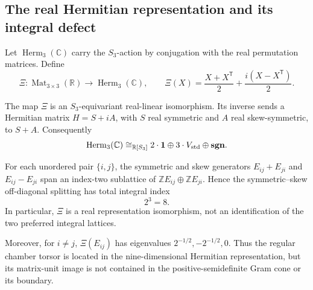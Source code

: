 \subsection{The real Hermitian representation and its integral defect}

Let \(\operatorname{Herm}_3(\mathbb C)\) carry the \(S_3\)-action by
conjugation with the real permutation matrices.  Define
\begin{equation}
 \Xi:\operatorname{Mat}_{3\times3}(\mathbb R)
       \longrightarrow\operatorname{Herm}_3(\mathbb C),
 \qquad
 \Xi(X)=\frac{X+X^{\mathsf T}}2
       +\frac{i(X-X^{\mathsf T})}2.
 \label{rnmt:eq:Xi}
\end{equation}

\begin{proposition}
\label{rnmt:prop:representation-bridge}
The map \(\Xi\) is an \(S_3\)-equivariant real-linear isomorphism.  Its
inverse sends a Hermitian matrix \(H=S+iA\), with \(S\) real symmetric and
\(A\) real skew-symmetric, to \(S+A\).  Consequently
\begin{equation}
 \operatorname{Herm}_3(\mathbb C)
 \cong_{\mathbb R[S_3]}
 2\mathbin{\cdot}\mathbf 1\oplus
 3\mathbin{\cdot}V_{\rm std}\oplus\mathbf{sgn}.
 \label{rnmt:eq:hermitian-character}
\end{equation}

For each unordered pair \(\{i,j\}\), the symmetric and skew generators
\(E_{ij}+E_{ji}\) and \(E_{ij}-E_{ji}\) span an index-two sublattice of
\(\mathbb ZE_{ij}\oplus\mathbb ZE_{ji}\).  Hence the symmetric--skew
off-diagonal splitting has total integral index
\begin{equation}
 2^3=8.
 \label{rnmt:eq:index-eight}
\end{equation}
In particular, \(\Xi\) is a real representation isomorphism, not an
identification of the two preferred integral lattices.

Moreover, for \(i\ne j\), \(\Xi(E_{ij})\) has eigenvalues
\(2^{-1/2},-2^{-1/2},0\).  Thus the regular chamber torsor is located in the
nine-dimensional Hermitian representation, but its matrix-unit image is not
contained in the positive-semidefinite Gram cone or its boundary.
\end{proposition}

